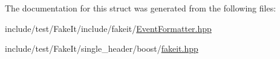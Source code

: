 The documentation for this struct was generated from the following files\+:\begin{DoxyCompactItemize}
\item 
include/test/\+Fake\+It/include/fakeit/\mbox{\hyperlink{EventFormatter_8hpp}{Event\+Formatter.\+hpp}}\item 
include/test/\+Fake\+It/single\+\_\+header/boost/\mbox{\hyperlink{single__header_2boost_2fakeit_8hpp}{fakeit.\+hpp}}\end{DoxyCompactItemize}

